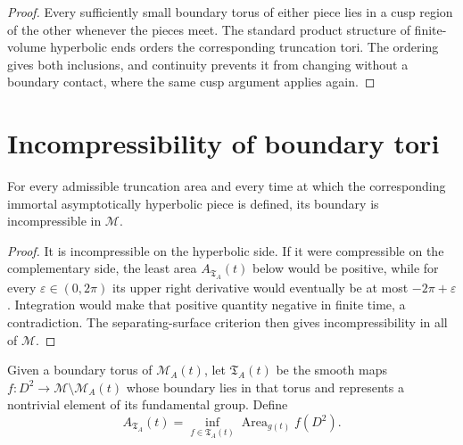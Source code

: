 \begin{proof}
\sketch
Every sufficiently small boundary torus of either piece lies in a cusp region
of the other whenever the pieces meet.  The standard product structure of
finite-volume hyperbolic ends orders the corresponding truncation tori.  The
ordering gives both inclusions, and continuity prevents it from changing
without a boundary contact, where the same cusp argument applies again.
\end{proof}

\section{Incompressibility of boundary tori}

\begin{theorem}
\label{thm:chow-iv-immortal-piece-boundary-incompressible}


For every admissible truncation area and every time at which the corresponding
immortal asymptotically hyperbolic piece is defined, its boundary is
incompressible in \(\mathcal M\).
\end{theorem}

\begin{proof}
\sketch
It is incompressible on the hyperbolic side.  If it were compressible on the
complementary side, the least area \(A_{\mathfrak T_A}(t)\) below would be
positive, while for every \(\varepsilon\in(0,2\pi)\) its upper right derivative
would eventually be at most \(-2\pi+\varepsilon\).  Integration would make
that positive quantity negative in finite time, a contradiction.  The
separating-surface criterion then gives incompressibility in all of
\(\mathcal M\).
\end{proof}

\begin{definition}
\label{def:chow-iv-disk-class-almost-piece}

Given a boundary torus of \(\mathcal M_A(t)\), let
\(\mathfrak T_A(t)\) be the smooth maps \(f:D^2\to\mathcal M\setminus
\mathcal M_A(t)\) whose boundary lies in that torus and represents a nontrivial
element of its fundamental group.  Define
\[
 A_{\mathfrak T_A}(t)=\inf_{f\in\mathfrak T_A(t)}
 \operatorname{Area}_{g(t)}f(D^2).
\]
\end{definition}

